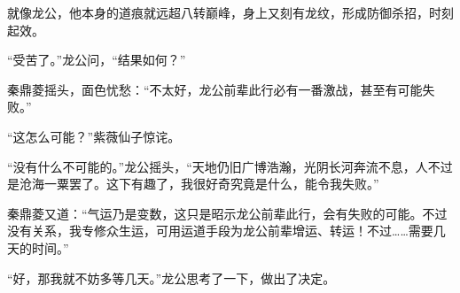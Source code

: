 \begin{this_body}
就像龙公，他本身的道痕就远超八转巅峰，身上又刻有龙纹，形成防御杀招，时刻起效。

“受苦了。”龙公问，“结果如何？”

秦鼎菱摇头，面色忧愁：“不太好，龙公前辈此行必有一番激战，甚至有可能失败。”

“这怎么可能？”紫薇仙子惊诧。

“没有什么不可能的。”龙公摇头，“天地仍旧广博浩瀚，光阴长河奔流不息，人不过是沧海一粟罢了。这下有趣了，我很好奇究竟是什么，能令我失败。”

秦鼎菱又道：“气运乃是变数，这只是昭示龙公前辈此行，会有失败的可能。不过没有关系，我专修众生运，可用运道手段为龙公前辈增运、转运！不过……需要几天的时间。”

“好，那我就不妨多等几天。”龙公思考了一下，做出了决定。

\end{this_body}

